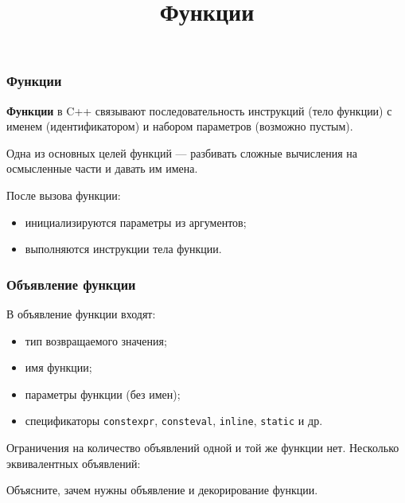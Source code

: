 \documentclass[compress, 8pt, aspectratio=169]{beamer}
\title{Функции}
\begin{document}
\frame[plain]{\titlepage}

\begin{frame}[fragile]

    \frametitle{Функции}

    \textbf{Функции} в C++ связывают последовательность инструкций (тело функции)
    с именем (идентификатором) и набором параметров (возможно пустым).

    \hfill\break
    Одна из основных целей функций --- разбивать сложные вычисления на осмысленные
    части и давать им имена.

    \hfill\break
    После вызова функции:

    \begin{itemize}
        \item инициализируются параметры из аргументов;
        \item выполняются инструкции тела функции.
    \end{itemize}

\end{frame}

\begin{frame}[fragile]

    \frametitle{Объявление функции}

    В объявление функции входят:

    \begin{itemize}
        \item тип возвращаемого значения;
        \item имя функции;
        \item параметры функции (без имен);
        \item спецификаторы \verb|constexpr|, \verb|consteval|, \verb|inline|, \verb|static| и др.
    \end{itemize}

    \hfill\break
    Ограничения на количество объявлений одной и той же функции нет.
    Несколько эквивалентных объявлений:

    \centering
    \hfill\break

    \begin{task}
        Объясните, зачем нужны объявление и декорирование функции.
    \end{task}

\end{frame}
\end{document}
